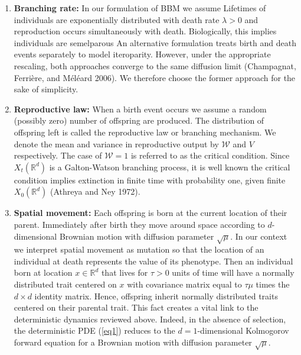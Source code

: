 \documentclass[]{article}
\begin{document}
\begin{enumerate}
\def\labelenumi{\arabic{enumi})}
\item
  \textbf{Branching rate:} In our formulation of BBM we assume Lifetimes
  of individuals are exponentially distributed with death rate
  \(\lambda>0\) and reproduction occurs simultaneously with death.
  Biologically, this implies individuals are semelparous An alternative
  formulation treats birth and death events separately to model
  iteroparity. However, under the appropriate rescaling, both approaches
  converge to the same diffusion limit (Champagnat, Ferrière, and
  Méléard 2006). We therefore choose the former approach for the sake of
  simplicity.
\item
  \textbf{Reproductive law:} When a birth event occurs we assume a
  random (possibly zero) number of offspring are produced. The
  distribution of offspring left is called the reproductive law or
  branching mechanism. We denote the mean and variance in reproductive
  output by \(\mathscr{W}\) and \(V\) respectively. The case of
  \(\mathscr{W}=1\) is referred to as the critical condition. Since
  \(X_t(\mathbb{R}^d)\) is a Galton-Watson branching process, it is well
  known the critical condition implies extinction in finite time with
  probability one, given finite \(X_0(\mathbb{R}^d)\) (Athreya and Ney
  1972).
\item
  \textbf{Spatial movement:} Each offspring is born at the current
  location of their parent. Immediately after birth they move around
  space according to \(d\)-dimensional Brownian motion with diffusion
  parameter \(\sqrt\mu\). In our context we interpret spatial movement
  as mutation so that the location of an individual at death represents
  the value of its phenotype. Then an individual born at location
  \(x\in\mathbb{R}^d\) that lives for \(\tau>0\) units of time will have
  a normally distributed trait centered on \(x\) with covariance matrix
  equal to \(\tau\mu\) times the \(d\times d\) identity matrix. Hence,
  offspring inherit normally distributed traits centered on their
  parental trait. This fact creates a vital link to the deterministic
  dynamics reviewed above. Indeed, in the absence of selection, the
  deterministic PDE (\ref{eq1}) reduces to the \(d=1\)-dimensional
  Kolmogorov forward equation for a Brownian motion with diffusion
  parameter \(\sqrt\mu\).
\end{enumerate}
\end{document}
